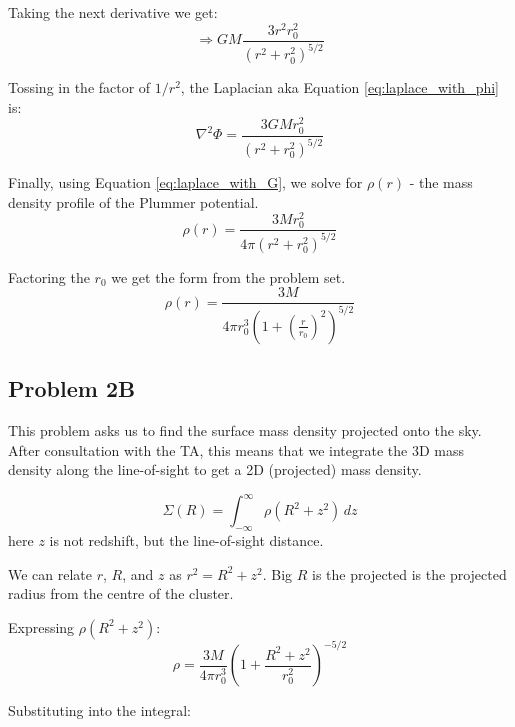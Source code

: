 
Taking the next derivative we get:
\begin{equation}
\Rightarrow GM\frac{3 r^2 r_0^2}{(r^2 + r_0^2)^{5/2}}
\end{equation}

Tossing in the factor of $1/r^2$, the Laplacian aka Equation \ref{eq:laplace_with_phi} is:
\begin{equation}
\nabla^2 \Phi = \frac{3 GM r_0^2}{(r^2 + r_0^2)^{5/2}}
\end{equation}


Finally, using Equation \ref{eq:laplace_with_G}, we solve for $\rho(r)$ -  the mass density profile of the Plummer potential.
\begin{equation}
\boxed{
\rho(r) = \frac{3 M r_0^2}{4 \pi (r^2 + r_0^2)^{5/2}}
}
\end{equation}

Factoring the $r_0$ we get the form from the problem set.
\begin{equation}
\boxed{
\rho(r) = \frac{3 M}{4 \pi r_0^3 \left( 1 + \left(\frac{r}{r_0}\right)^2 \right)^{5/2}}
}
\end{equation}


\subsection*{Problem 2B}

This problem asks us to find the surface mass density projected onto the sky. After consultation with the TA, this means that we integrate the 3D mass density along the line-of-sight to get a 2D (projected) mass density. 




\begin{equation}
\Sigma(R) = \int_{-\infty}^{\infty} \rho\!\left(R^{2} + z^{2}\right) \, dz
\end{equation}
here $z$ is not redshift, but the line-of-sight distance.

We can relate $r$, $R$, and $z$ as $r^2 = R^2 + z^2$. Big $R$ is the projected is the projected radius from the centre of the cluster.

Expressing $\rho\!\left(R^{2} + z^{2}\right)$:
\begin{equation}
\rho = \frac{3 M }{4\pi r_0^3} (1 +  \frac{R^2 + z^2}{r_0^2})^{-5/2}
\end{equation}

Substituting into the integral:

